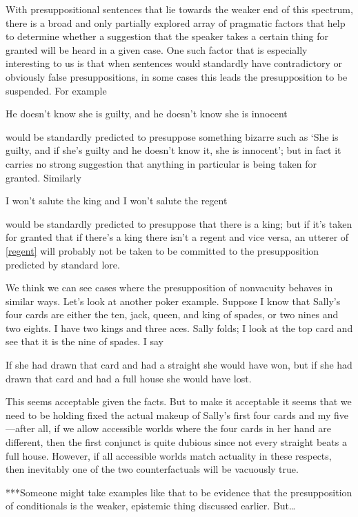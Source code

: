 \documentclass[If.tex]{subfiles}
\begin{document}
With presuppositional sentences that lie towards the weaker end of this spectrum, there is a broad and only partially explored array of pragmatic factors that help to determine whether a suggestion that the speaker takes a certain thing for granted will be heard in a given case. One such factor that is especially interesting to us is that when sentences would standardly have contradictory or obviously false presuppositions, in some cases this leads the presupposition to be suspended. For example
\begin{prop}
	\nitem 
		He doesn't know she is guilty, and he doesn't know she is innocent
\end{prop}
would be standardly predicted to presuppose something bizarre such as ‘She is guilty, and if she's guilty and he doesn't know it, she is innocent’; but in fact it carries no strong suggestion that anything in particular is being taken for granted. Similarly
\begin{prop}
	\nitem \label{regent}
		I won't salute the king and I won't salute the regent
\end{prop}
would be standardly predicted to presuppose that there is a king; but if it's taken for granted that if there's a king there isn't a regent and vice versa, an utterer of \ref{regent} will probably not be taken to be committed to the presupposition predicted by standard lore.

We think we can see cases where the presupposition of nonvacuity behaves in similar ways. Let's look at another poker example. Suppose I know that Sally's four cards are either the ten, jack, queen, and king of spades, or two nines and two eights. I have two kings and three aces. Sally folds; I look at the top card and see that it is the nine of spades. I say
\begin{prop}
	\nitem \label{cards}
		If she had drawn that card and had a straight she would have won, but if she had drawn that card and had a full house she would have lost.
\end{prop}
This seems acceptable given the facts. But to make it acceptable it seems that we need to be holding fixed the actual makeup of Sally's first four cards and my five---after all, if we allow accessible worlds where the four cards in her hand are different, then the first conjunct is quite dubious since not every straight beats a full house. However, if all accessible worlds match actuality in these respects, then inevitably one of the two counterfactuals will be vacuously true.

***Someone might take examples like that to be evidence that the presupposition of conditionals is the weaker, epistemic thing discussed earlier.  But…
\end{document}
